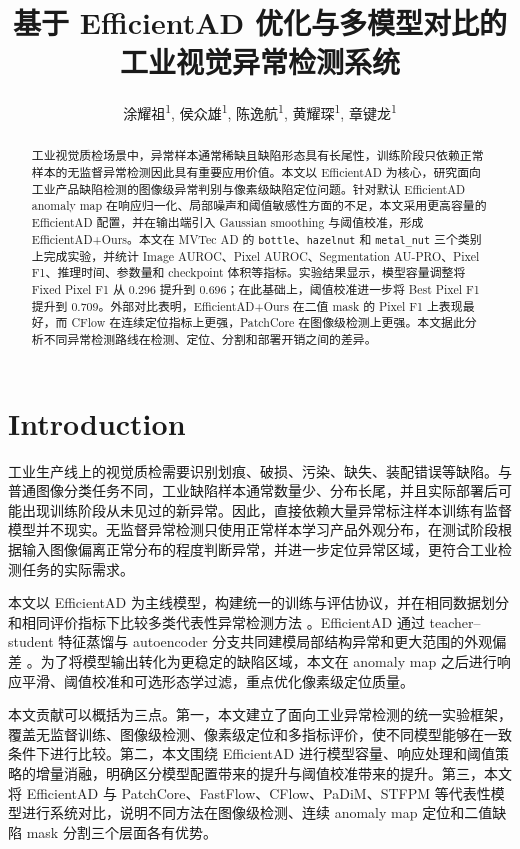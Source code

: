 \documentclass[letterpaper]{article}
\title{基于 EfficientAD 优化与多模型对比的工业视觉异常检测系统}
\author{
涂耀祖\textsuperscript{\rm 1},
侯众雄\textsuperscript{\rm 1},
陈逸航\textsuperscript{\rm 1},
黄耀琛\textsuperscript{\rm 1},
章键龙\textsuperscript{\rm 1}
}
\newcommand{\method}{EfficientAD+Ours}
\begin{document}
\maketitle

\begin{abstract}
工业视觉质检场景中，异常样本通常稀缺且缺陷形态具有长尾性，训练阶段只依赖正常样本的无监督异常检测因此具有重要应用价值。本文以 EfficientAD 为核心，研究面向工业产品缺陷检测的图像级异常判别与像素级缺陷定位问题。针对默认 EfficientAD anomaly map 在响应归一化、局部噪声和阈值敏感性方面的不足，本文采用更高容量的 EfficientAD 配置，并在输出端引入 Gaussian smoothing 与阈值校准，形成 \method{}。本文在 MVTec AD 的 \texttt{bottle}、\texttt{hazelnut} 和 \texttt{metal\_nut} 三个类别上完成实验，并统计 Image AUROC、Pixel AUROC、Segmentation AU-PRO、Pixel F1、推理时间、参数量和 checkpoint 体积等指标。实验结果显示，模型容量调整将 Fixed Pixel F1 从 0.296 提升到 0.696；在此基础上，阈值校准进一步将 Best Pixel F1 提升到 0.709。外部对比表明，\method{} 在二值 mask 的 Pixel F1 上表现最好，而 CFlow 在连续定位指标上更强，PatchCore 在图像级检测上更强。本文据此分析不同异常检测路线在检测、定位、分割和部署开销之间的差异。
\end{abstract}

\section{Introduction}

工业生产线上的视觉质检需要识别划痕、破损、污染、缺失、装配错误等缺陷。与普通图像分类任务不同，工业缺陷样本通常数量少、分布长尾，并且实际部署后可能出现训练阶段从未见过的新异常。因此，直接依赖大量异常标注样本训练有监督模型并不现实。无监督异常检测只使用正常样本学习产品外观分布，在测试阶段根据输入图像偏离正常分布的程度判断异常，并进一步定位异常区域，更符合工业检测任务的实际需求。

本文以 EfficientAD 为主线模型，构建统一的训练与评估协议，并在相同数据划分和相同评价指标下比较多类代表性异常检测方法 \citep{akcay2022anomalib,paszke2019pytorch}。EfficientAD 通过 teacher--student 特征蒸馏与 autoencoder 分支共同建模局部结构异常和更大范围的外观偏差 \citep{batzner2024efficientad}。为了将模型输出转化为更稳定的缺陷区域，本文在 anomaly map 之后进行响应平滑、阈值校准和可选形态学过滤，重点优化像素级定位质量。

本文贡献可以概括为三点。第一，本文建立了面向工业异常检测的统一实验框架，覆盖无监督训练、图像级检测、像素级定位和多指标评价，使不同模型能够在一致条件下进行比较。第二，本文围绕 EfficientAD 进行模型容量、响应处理和阈值策略的增量消融，明确区分模型配置带来的提升与阈值校准带来的提升。第三，本文将 EfficientAD 与 PatchCore、FastFlow、CFlow、PaDiM、STFPM 等代表性模型进行系统对比，说明不同方法在图像级检测、连续 anomaly map 定位和二值缺陷 mask 分割三个层面各有优势。
\end{document}
